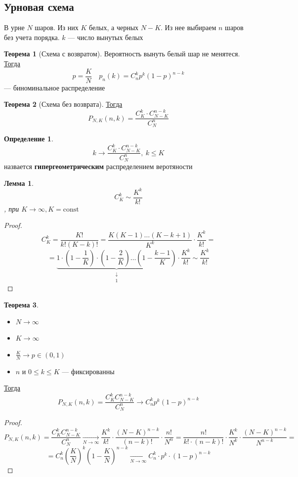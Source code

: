 \documentclass[oneside]{book}
\newcommand{\const}{\text{const}}
\theoremstyle{plain}
\newtheorem{lemma}{Лемма}
\theoremstyle{remark}
\theoremstyle{definition}
\newtheorem{theorem}{Теорема}[section]
\newtheorem*{definition}{Определение}
\begin{document}
\subsection{Урновая схема}
\label{sec:org82bd6f9}
В урне \(N\) шаров. Из них \(K\) белых, а черных \(N - K\). Из нее выбираем \(n\) шаров без учета порядка. \(k\) --- число вынутых белых
\begin{theorem}[Схема с возвратом]
Вероятность вынуть белый шар не менятеся. \\
\uline{Тогда} \[ p = \frac{K}{N}\quad p_n(k) = C^k_np^k(1 - p)^{n - k} \]
--- биноминальное распределение
\end{theorem}
\begin{theorem}[Схема без возврата]
\uline{Тогда} \[ P_{N,K}(n, k) = \frac{C^k_K\cdot C^{n-k}_{N - K}}{C^n_N} \]
\end{theorem}
\begin{definition}
\[ k \to \frac{C^k_K\cdot C^{n - k}_{N - K}}{C^n_N},\ k \le K \]
назвается \textbf{гипергеометрическим} распределением веротяности
\end{definition}
\begin{lemma}
\[ C^k_K \sim \frac{K^k}{k!} \]
, при \(K \to \infty, K = \const\)
\end{lemma}
\begin{proof}
\[ C^k_K = \frac{K!}{k!(K - k)!} = \frac{K(K - 1)\dots(K - k + 1)}{K^k}\cdot \frac{K^k}{k!} = \]
\[ = \underbrace{1 \cdot \left(1 - \frac{1}{K}\right)\cdot\left(1 - \frac{2}{K}\right) \dots \left(1 - \frac{k - 1}{K}\right)}_{\substack{\downarrow \\ 1}} \cdot\frac{K^k}{k!} \sim \frac{K^k}{k!}\]
\end{proof}
\begin{theorem}
\-
\begin{itemize}
\item \(N \to \infty\)
\item \(K \to \infty\)
\item \(\frac{K}{N} \to p \in (0, 1)\)
\item \(n\) и \(0 \le k \le K\) --- фиксированны
\end{itemize}
\uline{Тогда} \[ P_{N,K}(n,k) = \frac{C^k_KC^{n - k}_{N - K}}{C^n_N} \to C^k_np^k(1 - p)^{n - k} \]
\end{theorem}
\begin{proof}
\[ P_{N, K}(n, k) = \frac{C^k_KC^{n - k}_{N - K}}{C^n_N} \xrightarrow[N \to \infty]{} \frac{K^k}{k!}\cdot \frac{(N -K)^{n - k}}{(n - k)!}\cdot \frac{n!}{N^n} = \frac{n!}{k!\cdot(n- k)!}\cdot \frac{K^k}{N^k}\cdot\frac{(N - K)^{n - k}}{N^{n - k}} = \]
\[ = C^k_n\left(\frac{K}{N}\right)^k\left(1 - \frac{K}{N}\right)^{n -k} \xrightarrow[N \to \infty]{} C^k_n\cdot p^k \cdot ( 1- p)^{n - k}\]
\end{proof}
\end{document}
